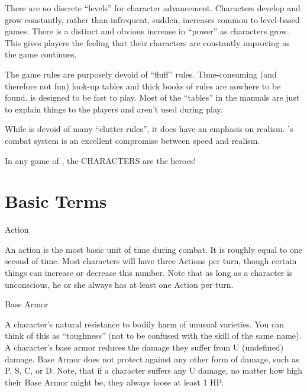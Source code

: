 \documentclass[twoside]{book}
\begin{document}
                 There are no discrete “levels” for
                 character advancement. Characters develop and grow
                 constantly, rather than infrequent, sudden, increases
                 common to level-based games. There is a distinct and
                 obvious increase in “power” as characters
                 grow. This gives players the feeling that their
                 characters are constantly improving as the game
                 continues. 
              
              
                The game rules are purposely devoid of
                “fluff” rules. Time-consuming (and therefore
                not fun) look-up tables and thick books of rules are
                nowhere to be found. \APATHY{}  is designed to be fast
                to play. Most of the “tables” in the \APATHY{}  manuals are just to explain things to the players and
                aren’t used during play.
                
              
              
                While \APATHY{}  is devoid of many “clutter
                rules”, it does have an emphasis on realism.
                \APATHY{}’s combat system is an excellent
                compromise between speed and realism.
                
              
           In any game of \APATHY{}, the CHARACTERS are the
            heroes!
          
\section{Basic Terms}
      
              
              
                 Action 
                
                 An action is the most basic unit of time during
                 combat. It is roughly equal to one second of time. Most
                 characters will have three Actions per turn, though
                 certain things can increase or decrease this number.
                 Note that as long as a character is unconscious, he or
                 she always has at least one Action per turn. 
              
              
              
                 Base Armor 
                
                  A character’s natural resistance to bodily
                 harm of unusual varieties. You can think of this as
                 “toughness” (not to be confused with the
                 skill of the same name). A character’s base armor
                 reduces the damage they suffer from U (undefined)
                 damage. Base Armor does not protect against any other
                 form of damage, such as P, S, C, or D. Note, that if a
                 character suffers any U damage, no matter how high their
                 Base Armor might be, they always loose at least 1 HP.
                 
\end{document}
